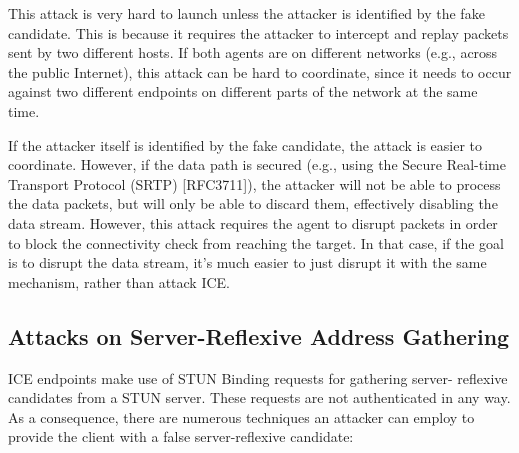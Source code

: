 \documentclass{article}
\begin{document}
This attack is very hard to launch unless the attacker is identified by the fake candidate.  This is because it requires the attacker to intercept and replay packets sent by two different hosts.  If both agents are on different networks (e.g., across the public Internet), this attack can be hard to coordinate, since it needs to occur against two different endpoints on different parts of the network at the same time.

If the attacker itself is identified by the fake candidate, the attack is easier to coordinate.  However, if the data path is secured (e.g., using the Secure Real-time Transport Protocol (SRTP) [RFC3711]), the attacker will not be able to process the data packets, but will only be able to discard them, effectively disabling the data stream.  However, this attack requires the agent to disrupt packets in order to block the connectivity check from reaching the target.  In that case, if the goal is to disrupt the data stream, it's much easier to just disrupt it with the same mechanism, rather than attack ICE.

\subsection{Attacks on Server-Reflexive Address Gathering}

ICE endpoints make use of STUN Binding requests for gathering server- reflexive candidates from a STUN server.  These requests are not authenticated in any way.  As a consequence, there are numerous techniques an attacker can employ to provide the client with a false server-reflexive candidate:
\end{document}
